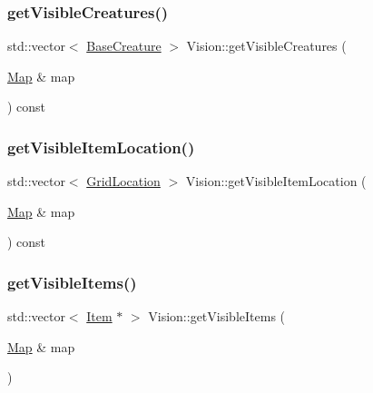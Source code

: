 \mbox{\label{class_vision_ad8806902c3144f15827fd93c1aabfa06}} 
\subsubsection{\texorpdfstring{get\+Visible\+Creatures()}{getVisibleCreatures()}}
{\footnotesize\ttfamily std\+::vector$<$ \mbox{\hyperlink{class_base_creature}{Base\+Creature}} $>$ Vision\+::get\+Visible\+Creatures (\begin{DoxyParamCaption}\item[{\mbox{\hyperlink{class_map}{Map}} \&}]{map }\end{DoxyParamCaption}) const}

\mbox{\label{class_vision_aaada841a563a60650e2261796ff18713}} 
\subsubsection{\texorpdfstring{get\+Visible\+Item\+Location()}{getVisibleItemLocation()}}
{\footnotesize\ttfamily std\+::vector$<$ \mbox{\hyperlink{struct_grid_location}{Grid\+Location}} $>$ Vision\+::get\+Visible\+Item\+Location (\begin{DoxyParamCaption}\item[{\mbox{\hyperlink{class_map}{Map}} \&}]{map }\end{DoxyParamCaption}) const}

\mbox{\label{class_vision_a57e240a165d83bd1869e4053af0a4569}} 
\subsubsection{\texorpdfstring{get\+Visible\+Items()}{getVisibleItems()}}
{\footnotesize\ttfamily std\+::vector$<$ \mbox{\hyperlink{class_item}{Item}} $\ast$ $>$ Vision\+::get\+Visible\+Items (\begin{DoxyParamCaption}\item[{\mbox{\hyperlink{class_map}{Map}} \&}]{map }\end{DoxyParamCaption})}

